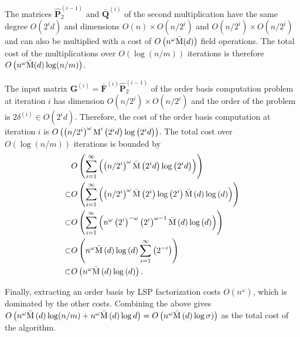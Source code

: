 \begin{pf}
The matrices $\hat{\mathbf{P}}_{2}^{\left(i-1\right)}$ and $\bar{\mathbf{Q}}^{\left(i\right)}$
of the second multiplication have the same degree $O(2^{i}d)$ and
dimensions $O\left(n\right)\times O(n/2^{i})$ and $O(n/2^{i})\times O(n/2^{i})$
and can also be multiplied with a cost of $O\left(n^{\omega}\bar{\M}(d)\right)$
field operations. The total cost of the multiplications over $O(\log\left(n/m\right))$
iterations is therefore $O\left(n^{\omega}\bar{\M}(d)\log(n/m)\right)$.

The input matrix $\mathbf{G}^{\left(i\right)}=\bar{\mathbf{F}}^{\left(i\right)}\hat{\mathbf{P}}_{2}^{\left(i-1\right)}$
of the order basis computation problem at iteration $i$ has dimension
$O(n/2^{i})\times O(n/2^{i})$ and the order of the problem is $2\delta^{\left(i\right)}\in O(2^{i}d)$.
Therefore, the cost of the order basis computation at iteration $i$
is $O\left(\left(n/2^{i}\right)^{\omega}\M'\left(2^{i}d\right)\log\left(2^{i}d\right)\right)$.
The total cost over $O(\log\left(n/m\right))$ iterations is bounded
by \begin{align*}
 & O\left(\sum_{i=1}^{\infty}\left(\left(n/2^{i}\right)^{\omega}\bar{\M}\left(2^{i}d\right)\log\left(2^{i}d\right)\right)\right)\\
\subset & O\left(\sum_{i=1}^{\infty}\left(\left(n/2^{i}\right)^{\omega}\bar{\M}\left(2^{i}\right)\log\left(2^{i}\right)\bar{\M}\left(d\right)\log\left(d\right)\right)\right)\\
\subset & O\left(\sum_{i=1}^{\infty}\left(n^{\omega}\left(2^{i}\right)^{-\omega}\left(2^{i}\right)^{\omega-1}\bar{\M}\left(d\right)\log\left(d\right)\right)\right)\\
\subset & O\left(n^{\omega}\bar{\M}\left(d\right)\log\left(d\right)\sum_{i=1}^{\infty}\left(2^{-i}\right)\right)\\
\subset & O\left(n^{\omega}\bar{\M}\left(d\right)\log\left(d\right)\right).\end{align*}


Finally, extracting an order basis by LSP factorization costs $O\left(n^{\omega}\right)$,
which is dominated by the other costs. Combining the above gives $O\left(n^{\omega}\bar{\M}\left(d\right)\log(n/m)+n^{\omega}\bar{\M}\left(d\right)\log d\right)=O\left(n^{\omega}\bar{\M}\left(d\right)\log\sigma)\right)$
as the total cost of the algorithm. 
\end{pf}

